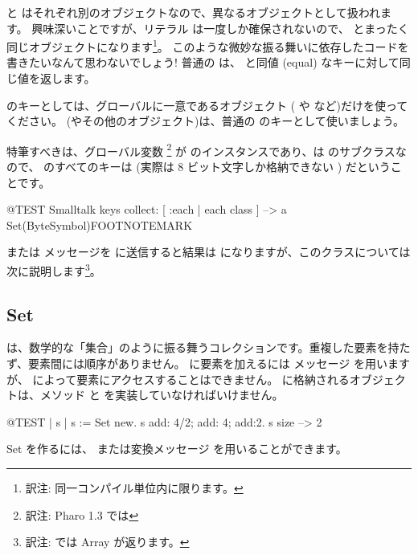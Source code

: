 \documentclass[a4paper,10pt,twoside]{book}
\begin{document}
\noindent
{} と  はそれぞれ別のオブジェクトなので、異なるオブジェクトとして扱われます。
興味深いことですが、リテラル \mbox{} は一度しか確保されないので、 とまったく同じオブジェクトになります\footnote{訳注: 同一コンパイル単位内に限ります。}。
このような微妙な振る舞いに依存したコードを書きたいなんて思わないでしょう!
普通の  は、 と同値 (equal) なキーに対して同じ値を返します。

 のキーとしては、グローバルに一意であるオブジェクト ( や  など)だけを使ってください。 (やその他のオブジェクト)は、普通の  のキーとして使いましょう。


特筆すべきは、グローバル変数 \footnote{訳注: Pharo 1.3 では } が  のインスタンスであり、は  のサブクラスなので、 のすべてのキーは  (実際は 8 ビット文字しか格納できない ) だということです。

\begin{code}{@TEST}
Smalltalk keys collect: [ :each | each class ] --> a Set(ByteSymbol)FOOTNOTEMARK
\end{code}
\noindent
{} または  メッセージを  に送信すると結果は  になりますが、このクラスについては次に説明します\footnote{訳注:  では Array が返ります。}。

\subsection{Set}
 は、数学的な「集合」のように振る舞うコレクションです。\ie 重複した要素を持たず、要素間には順序がありません。 に要素を加えるには メッセージ を用いますが、 によって要素にアクセスすることはできません。 に格納されるオブジェクトは、メソッド  と \ct{=} を実装していなければいけません。

\begin{code}{@TEST | s | }
s := Set new.
s add: 4/2; add: 4; add:2.
s size --> 2
\end{code}

Set を作るには、 または変換メッセージ  を用いることができます。
\end{document}
